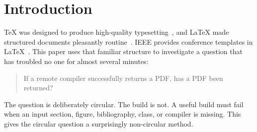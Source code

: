 \section{Introduction}

TeX was designed to produce high-quality typesetting~\cite{knuth1984texbook},
and LaTeX made structured documents pleasantly routine~\cite{lamport1994latex}.
IEEE provides conference templates in LaTeX~\cite{ieeeAuthorCenter}. This paper
uses that familiar structure to investigate a question that has troubled no
one for almost several minutes:

\begin{quote}
If a remote compiler successfully returns a PDF, has a PDF been returned?
\end{quote}

The question is deliberately circular. The build is not. A useful build must
fail when an input section, figure, bibliography, class, or compiler is
missing. This gives the circular question a surprisingly non-circular method.

